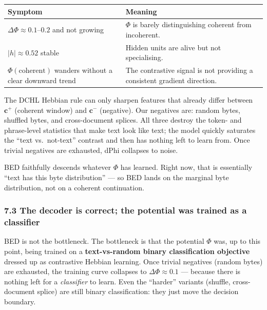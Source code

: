 \documentclass[
  11pt,
  a4paper,
]{article}
\begin{document}
\begin{longtable}[]{@{}
  >{\raggedright\arraybackslash}p{}
  >{\raggedright\arraybackslash}p{}@{}}
\toprule\noalign{}
\begin{minipage}[b]{\linewidth}\raggedright
Symptom
\end{minipage} & \begin{minipage}[b]{\linewidth}\raggedright
Meaning
\end{minipage} \\
\midrule\noalign{}
\endhead
\bottomrule\noalign{}
\endlastfoot
\(\Delta\Phi \approx 0.1\)--\(0.2\) and not growing & \(\Phi\) is barely
distinguishing coherent from incoherent. \\
\(\lvert h \rvert \approx 0.52\) stable & Hidden units are alive but not
specialising. \\
\(\Phi(\text{coherent})\) wanders without a clear downward trend & The
contrastive signal is not providing a consistent gradient direction. \\
\end{longtable}

The DCHL Hebbian rule can only sharpen features that already differ
between \(\mathbf{c}^{+}\) (coherent window) and \(\mathbf{c}^{-}\)
(negative). Our negatives are: random bytes, shuffled bytes, and
cross-document splices. All three destroy the token- and phrase-level
statistics that make text look like text; the model quickly saturates
the ``text vs.~not-text'' contrast and then has nothing left to learn
from. Once trivial negatives are exhausted, dPhi collapses to noise.

BED faithfully descends whatever \(\Phi\) has learned. Right now, that
is essentially ``text has this byte distribution'' --- so BED lands on
the marginal byte distribution, not on a coherent continuation.

\subsubsection{7.3 The decoder is correct; the potential was trained as
a
classifier}\label{the-decoder-is-correct-the-potential-was-trained-as-a-classifier}

BED is not the bottleneck. The bottleneck is that the potential \(\Phi\)
was, up to this point, being trained on a \textbf{text-vs-random binary
classification objective} dressed up as contrastive Hebbian learning.
Once trivial negatives (random bytes) are exhausted, the training curve
collapses to \(\Delta\Phi \approx 0.1\) --- because there is nothing
left for a \emph{classifier} to learn. Even the ``harder'' variants
(shuffle, cross-document splice) are still binary classification: they
just move the decision boundary.
\end{document}
